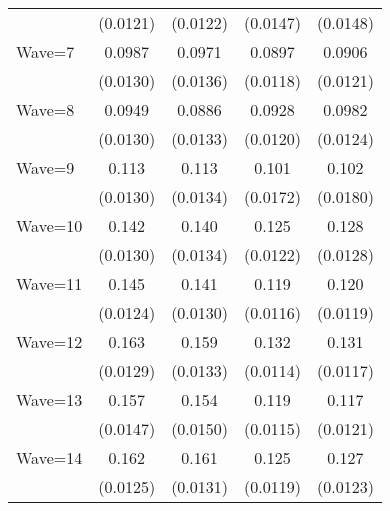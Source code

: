 {\begin{tabular}{l*{4}{c}}
                    &    (0.0121)         &    (0.0122)         &    (0.0147)         &    (0.0148)         \\
[1em]
Wave=7              &      0.0987\sym{***}&      0.0971\sym{***}&      0.0897\sym{***}&      0.0906\sym{***}\\
                    &    (0.0130)         &    (0.0136)         &    (0.0118)         &    (0.0121)         \\
[1em]
Wave=8              &      0.0949\sym{***}&      0.0886\sym{***}&      0.0928\sym{***}&      0.0982\sym{***}\\
                    &    (0.0130)         &    (0.0133)         &    (0.0120)         &    (0.0124)         \\
[1em]
Wave=9              &       0.113\sym{***}&       0.113\sym{***}&       0.101\sym{***}&       0.102\sym{***}\\
                    &    (0.0130)         &    (0.0134)         &    (0.0172)         &    (0.0180)         \\
[1em]
Wave=10             &       0.142\sym{***}&       0.140\sym{***}&       0.125\sym{***}&       0.128\sym{***}\\
                    &    (0.0130)         &    (0.0134)         &    (0.0122)         &    (0.0128)         \\
[1em]
Wave=11             &       0.145\sym{***}&       0.141\sym{***}&       0.119\sym{***}&       0.120\sym{***}\\
                    &    (0.0124)         &    (0.0130)         &    (0.0116)         &    (0.0119)         \\
[1em]
Wave=12             &       0.163\sym{***}&       0.159\sym{***}&       0.132\sym{***}&       0.131\sym{***}\\
                    &    (0.0129)         &    (0.0133)         &    (0.0114)         &    (0.0117)         \\
[1em]
Wave=13             &       0.157\sym{***}&       0.154\sym{***}&       0.119\sym{***}&       0.117\sym{***}\\
                    &    (0.0147)         &    (0.0150)         &    (0.0115)         &    (0.0121)         \\
[1em]
Wave=14             &       0.162\sym{***}&       0.161\sym{***}&       0.125\sym{***}&       0.127\sym{***}\\
                    &    (0.0125)         &    (0.0131)         &    (0.0119)         &    (0.0123)         \\

\end{tabular}}
